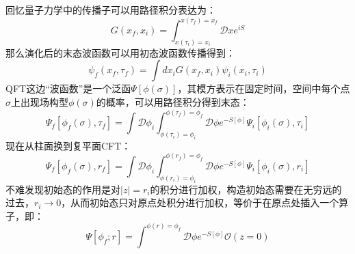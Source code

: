 回忆量子力学中的传播子可以用路径积分表达为：
\begin{equation}
	G(x_f,x_i)=\int_{x(\tau_i)=x_i}^{x(\tau_f)=x_f}\mathcal{D}xe^{iS}
\end{equation}
那么演化后的末态波函数可以用初态波函数传播得到：
\begin{equation}
	\psi_{f}(x_{f},\tau_{f})=\int dx_{i}G(x_{f},x_{i})\psi_{i}(x_{i},\tau_{i})
\end{equation}
QFT这边“波函数”是一个泛函$\Psi[\phi(\sigma)]$，其模方表示在固定时间，空间中每个点$\sigma$上出现场构型$\phi(\sigma)$的概率，可以用路径积分得到末态：
\begin{equation}
	\Psi_f[\phi_f(\sigma),\tau_f]=\int\mathcal{D}\phi_i\int_{\phi(\tau_i)=\phi_i}^{\phi(\tau_f)=\phi_f}\mathcal{D}\phi e^{-S[\phi]}\Psi_i[\phi_i(\sigma),\tau_i]
\end{equation}
现在从柱面换到复平面CFT：
\begin{equation}
	\Psi_f[\phi_f(\sigma),r_f]=\int\mathcal{D}\phi_i\int_{\phi(r_i)=\phi_i}^{\phi(r_f)=\phi_f}\mathcal{D}\phi e^{-S[\phi]}\Psi_i[\phi_i(\sigma),r_i]
\end{equation}
不难发现初始态的作用是对$|z|=r_i$的积分进行加权，构造初始态需要在无穷远的过去，$r_i\to 0$，从而初始态只对原点处积分进行加权，等价于在原点处插入一个算子，即：
\begin{equation}
	\Psi[\phi_f;r]=\int^{\phi(r)=\phi_f}\mathcal{D}\phi e^{-S[\phi]}\mathcal{O}(z=0)
\end{equation}

